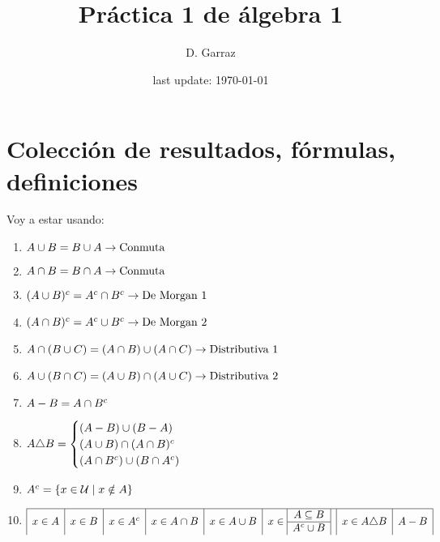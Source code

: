 \documentclass[12pt,a4paper, spanish]{article}
\begin{document}
\pagestyle{empty} %

\title{Práctica 1 de álgebra 1} %
\author{D. Garraz} %
\date{last update: \today} %

\section*{Colección de resultados, fórmulas, definiciones}
Voy a estar usando:
\begin{enumerate}[label=(\alph*)]
	\item $A \cup B = B \cup A \to \text{Conmuta}$
	\item $A \cap B = B \cap A \to \text{Conmuta}$
	\item $(A \cup B)^c = A^c \cap B^c \to \text{De Morgan 1}$
	\item $(A \cap B)^c = A^c \cup B^c \to \text{De Morgan 2}$
	\item $A \cap(B \cup C) = (A \cap B) \cup (A \cap C) \to \text{Distributiva 1}$
	\item $A \cup(B \cap C) = (A \cup B) \cap (A \cup C) \to \text{Distributiva 2}$
	\item $A - B = A \cap B^c$
	\item $A \triangle B =
		      \begin{cases}
			      (A - B) \cup (B - A)             \\
			      (A \cup B) \cap (A \cap B)^c \\
			      (A \cap B^c) \cup (B \cap A^c)
		      \end{cases}
	      $
	\item $A^c = \left\{ x \in \mathcal U \;|\; x \notin A \right\}$
	\item
	      \def\subconjuntoYequivalente{
		      \begin{array}{|c|}
			      A \subseteq B \\
			      \hline
			      A^c \union B
		      \end{array}
	      }
	      \[
		      \begin{array}{|c|c|c|c|c|c|c|c|}
			      \hline
			      x \en A & x \en B & x \en A^c & x \en A \inter B & x \en A \union B & x \en \subconjuntoYequivalente & x \en A \triangle B & A - B \\

\end{array}\]
\end{enumerate}
\end{document}
